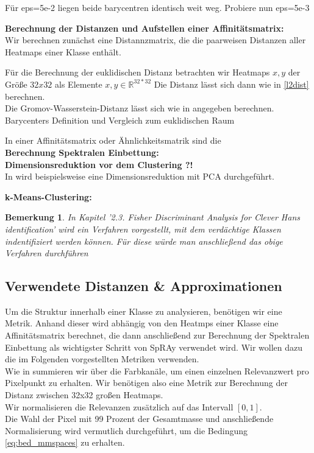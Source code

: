 \documentclass[11pt,a4paper]{article}
\newtheorem{remark}[theorem]{Bemerkung}
\numberwithin{equation}{section}
\begin{document}
	Für eps=5e-2 liegen beide barycentren identisch weit weg. Probiere nun eps=5e-3
	
	\noindent \textbf{Berechnung der Distanzen und Aufstellen einer Affinitätsmatrix:}\\
	
	Wir berechnen zunächst eine Distannzmatrix, die die paarweisen Distanzen aller Heatmaps einer Klasse enthält.	
	
	Für die Berechnung der euklidischen Distanz betrachten wir Heatmaps $x,y$ der Größe $32x32$ als Elemente $x,y \in \mathbb{R}^{32*32}$ Die Distanz lässt sich dann wie in \autoref{l2dist} berechnen.\\
	
	Die Gromov-Wasserstein-Distanz lässt sich wie in \cite{gwd_averaging_kernels} angegeben berechnen. \\
	
	Barycenters Definition und Vergleich zum euklidischen Raum \cite{bary_wasserstein_space}
	
	In einer Affinitätsmatrix oder Ähnlichkeitsmatrik sind die \\
	
	\noindent \textbf{Berechnung Spektralen Einbettung:}\\
	
	\noindent \textbf{Dimensionsreduktion vor dem Clustering ?!}\\
	
	In \cite{AC} wird beispielsweise eine Dimensionsreduktion mit PCA durchgeführt.
	
	\noindent \textbf{k-Means-Clustering:}\\
	\begin{remark}
		In \cite{imagenet_unhansed_v1} Kapitel '2.3. Fisher Discriminant Analysis for Clever Hans
		identification' wird ein Verfahren vorgestellt, mit dem verdächtige Klassen indentifiziert werden können. Für diese würde man anschließend das obige Verfahren durchführen
	\end{remark}
	\subsection{Verwendete Distanzen \& Approximationen}
	Um die Struktur innerhalb einer Klasse zu analysieren, benötigen wir eine Metrik.
	Anhand dieser wird abhängig von den Heatmps einer Klasse eine Affinitätsmatrix berechnet, die dann anschließend zur Berechnung der Spektralen Einbettung als wichtigster Schritt von SpRAy verwendet wird. Wir wollen dazu die im Folgenden vorgestellten Metriken verwenden.\\
	Wie in \cite{imagenet_unhansed_v1} summieren wir über die Farbkanäle, um einen einzelnen Relevanzwert pro Pixelpunkt zu erhalten. Wir benötigen also eine Metrik zur Berechnung der Distanz zwischen 32x32 großen Heatmaps.\\
	Wir normalisieren die Relevanzen zusätzlich auf das Intervall $[0,1]$.\\
	Die Wahl der Pixel mit 99 Prozent der Gesamtmasse und anschließende Normalisierung wird vermutlich durchgeführt, um die Bedingung \autoref{eq:bed_mmspaces} zu erhalten.
\end{document}
